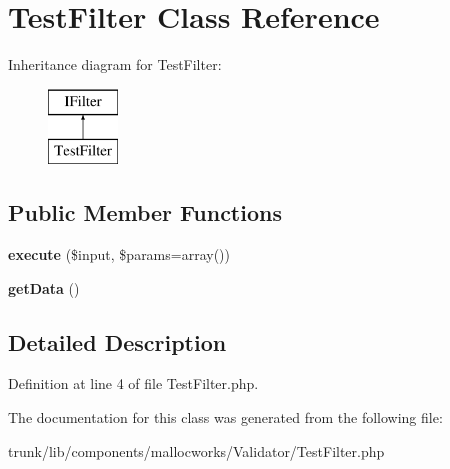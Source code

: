 \hypertarget{class_utopia_1_1_components_1_1_filter_1_1_test_filter}{
\section{TestFilter Class Reference}
\label{class_utopia_1_1_components_1_1_filter_1_1_test_filter}
}
Inheritance diagram for TestFilter:\begin{figure}[H]
\begin{center}
\leavevmode
\includegraphics[height=2.000000cm]{class_utopia_1_1_components_1_1_filter_1_1_test_filter}
\end{center}
\end{figure}
\subsection*{Public Member Functions}
\begin{DoxyCompactItemize}
\item 
\hypertarget{class_utopia_1_1_components_1_1_filter_1_1_test_filter_ad90dcfe8ce8e387875a2d991f35ca839}{
{\bfseries execute} (\$input, \$params=array())}
\label{class_utopia_1_1_components_1_1_filter_1_1_test_filter_ad90dcfe8ce8e387875a2d991f35ca839}

\item 
\hypertarget{class_utopia_1_1_components_1_1_filter_1_1_test_filter_a81a67162a6288d78fc4c55283325f0b4}{
{\bfseries getData} ()}
\label{class_utopia_1_1_components_1_1_filter_1_1_test_filter_a81a67162a6288d78fc4c55283325f0b4}

\end{DoxyCompactItemize}


\subsection{Detailed Description}


Definition at line 4 of file TestFilter.php.



The documentation for this class was generated from the following file:\begin{DoxyCompactItemize}
\item 
trunk/lib/components/mallocworks/Validator/TestFilter.php\end{DoxyCompactItemize}
